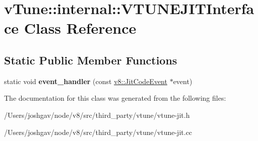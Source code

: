 \hypertarget{classv_tune_1_1internal_1_1_v_t_u_n_e_j_i_t_interface}{}\section{v\+Tune\+:\+:internal\+:\+:V\+T\+U\+N\+E\+J\+I\+T\+Interface Class Reference}
\label{classv_tune_1_1internal_1_1_v_t_u_n_e_j_i_t_interface}
\subsection*{Static Public Member Functions}
\begin{DoxyCompactItemize}
\item 
static void {\bfseries event\+\_\+handler} (const \hyperlink{structv8_1_1_jit_code_event}{v8\+::\+Jit\+Code\+Event} $\ast$event)\hypertarget{classv_tune_1_1internal_1_1_v_t_u_n_e_j_i_t_interface_ae15fda77f51e4ffccd3e32b4baa2a045}{}\label{classv_tune_1_1internal_1_1_v_t_u_n_e_j_i_t_interface_ae15fda77f51e4ffccd3e32b4baa2a045}

\end{DoxyCompactItemize}


The documentation for this class was generated from the following files\+:\begin{DoxyCompactItemize}
\item 
/\+Users/joshgav/node/v8/src/third\+\_\+party/vtune/vtune-\/jit.\+h\item 
/\+Users/joshgav/node/v8/src/third\+\_\+party/vtune/vtune-\/jit.\+cc\end{DoxyCompactItemize}
